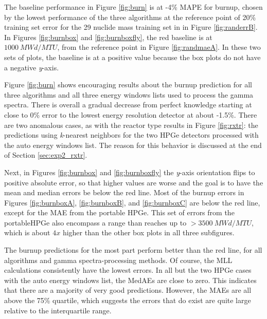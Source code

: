 The baseline performance in Figure \ref{fig:burn} is at -4\% \gls{MAPE} for
burnup, chosen by the lowest performance of the three algorithms at the
reference point of 20\% training set error for the 29 nuclide mass training set
in in Figure \ref{fig:randerrB}. In Figures \ref{fig:burnbox} and
\ref{fig:burnboxfly}, the red baseline is at $1000\:MWd/MTU$, from the
reference point in Figure \ref{fig:randmaeA}.  In these two sets of plots, the
baseline is at a positive value because the box plots do not have a negative
\textit{y}-axis. 

Figure \ref{fig:burn} shows encouraging results about the burnup prediction
for all three algorithms and all three energy windows lists used to process the
gamma spectra. There is overall a gradual decrease from perfect knowledge
starting at close to 0\% error to the lowest energy resolution detector at
about -1.5\%.  There are two anomalous cases, as with the reactor type results
in Figure \ref{fig:rxtr}: the predictions using \textit{k}-nearest neighbors
for the two \gls{HPGe} detectors processed with the auto energy windows list.
The reason for this behavior is discussed at the end of Section
\ref{sec:exp2_rxtr}. 

Next, in Figures \ref{fig:burnbox} and \ref{fig:burnboxfly} the \textit{y}-axis
orientation flips to positive absolute error, so that higher values are worse
and the goal is to have the mean and median errors be below the red line.  Most
of the burnup errors in Figures \ref{fig:burnboxA}, \ref{fig:burnboxB}, and
\ref{fig:burnboxC} are below the red line, except for the \gls{MAE} from the
portable \gls{HPGe}. This set of errors from the portable\gls{HPGe} also
encompass a range than reaches up to $>3500\:MWd/MTU$, which is about $4x$
higher than the other box plots in all three subfigures. 

The burnup predictions for the most part perform better than the red line, for
all algorithms and gamma spectra-processing methods.  Of course, the \gls{MLL}
calculations consistently have the lowest errors. In all but the two \gls{HPGe}
cases with the auto energy windows list, the \gls{MedAE}s are close to zero.
This indicates that there are a majority  of very good
predictions. However, the \gls{MAE}s are all above the 75\% quartile, which
suggests the errors that do exist are quite large relative to the interquartile
range.  

